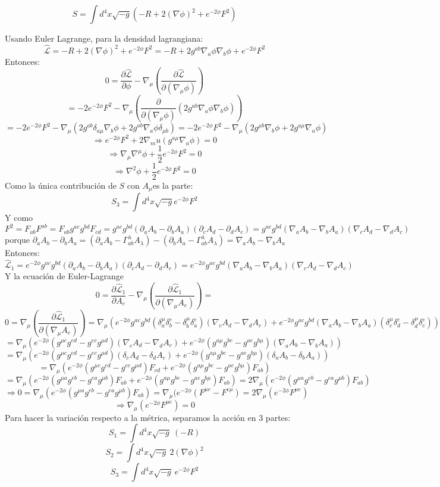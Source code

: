 \documentclass[10pt,a4paper]{article}
\begin{document}
$$S = \int d^4x \sqrt{-g}(-R +2(\nabla \phi)^2 + e^{-2 \phi} F^2)$$

Usando Euler Lagrange, para la densidad lagrangiana:
$$ \hat{\mathcal{L}} = -R + 2(\nabla \phi)^2 + e^{-2 \phi} F^2 = -R + 2g^{ab}\nabla_a\phi\nabla_b\phi + e^{-2 \phi} F^2 $$
Entonces:
$$0 = \frac{\partial \hat{\mathcal{L}}}{\partial \phi} - \nabla_\mu (\frac{\partial \hat{\mathcal{L}}}{\partial (\nabla_\mu \phi)}) $$
$$ = -2e^{-2\phi}F^2 - \nabla_\mu(\frac{\partial }{\partial (\nabla_\mu \phi)}(2g^{ab}\nabla_a\phi \nabla_b\phi))$$
$$= -2e^{-2\phi} F^2 - \nabla_\mu(2g^{ab}\delta_{a\mu}\nabla_b\phi + 2g^{ab}\nabla_a\phi \delta_{\mu b}) = -2e^{-2\phi}F^2 - \nabla_\mu(2g^{\mu b}\nabla_b\phi + 2g^{a\mu}\nabla_a\phi)$$
$$\Rightarrow e^{-2\phi}F^2 + 2\nabla_mu (g^{a\mu}\nabla_a \phi) = 0$$
$$\Rightarrow \nabla_{\mu} \nabla^{\mu} \phi + \frac{1}{2}e^{-2\phi}F^2  = 0$$
$$\Rightarrow  \nabla^2 \phi + \frac{1}{2}e^{-2\phi}F^2 = 0$$
Como la única contribución de $S$ con $A_{\mu}$es la parte:
$$S_3 = \int d^4x \sqrt{-g}e^{-2 \phi}F^2$$
Y como $F^2 = F_{ab}F^{ab}= F_{ab}g^{ac}g^{bd}F_{cd} = g^{ac}g^{bd}(\partial_a A_b -\partial_b A_a)(\partial_c A_d -\partial_d A_c) = g^{ac}g^{bd}(\nabla_a A_b -\nabla_b A_a)(\nabla_c A_d -\nabla_d A_c)$ porque $ \partial_a A_b -\partial_b A_a = (\partial_a A_b -\Gamma^{\lambda}_{ab}A_\lambda) -(\partial_b A_a - \Gamma^\lambda_{ab}A_{\lambda}) = \nabla_a A_b -\nabla_b A_a$
Entonces:
$$\hat{\mathcal{L}}_1 = e^{-2 \phi} g^{ac}g^{bd}(\partial_a A_b -\partial_b A_a)(\partial_c A_d -\partial_d A_c) = e^{-2 \phi} g^{ac}g^{bd}(\nabla_a A_b -\nabla_b A_a)(\nabla_c A_d -\nabla_d A_c)$$
Y la ecuación de Euler-Lagrange
$$0 = \frac{\partial \hat{\mathcal{L}}_1}{\partial A_e} - \nabla_\mu (\frac{\partial \hat{\mathcal{L}}_1}{\partial (\nabla_\mu A_e)}) = $$
$$0 = \nabla_\mu (\frac{\partial \hat{\mathcal{L}}_1}{\partial (\nabla_\mu A_e)}) = \nabla_\mu (e^{-2\phi}g^{ac}g^{bd}(\delta^\mu_{a}\delta^e_{b}-\delta^\mu_{b}\delta^e_{a})(\nabla_c A_d - \nabla_d A_c) +e^{-2\phi}g^{ac}g^{bd}(\nabla_a A_b -\nabla_b A_a)(\delta^\mu_{c}\delta^e_{d}-\delta^\mu_{d}\delta^e_{c}))$$
$$= \nabla_\mu (e^{-2\phi}(g^{\mu c}g^{ed}-g^{ec}g^{\mu d})(\nabla_c A_d - \nabla_d A_c) +e^{-2\phi}(g^{a\mu}g^{be} - g^{ae}g^{b\mu})(\nabla_a A_b -\nabla_b A_a))$$
$$= \nabla_\mu (e^{-2\phi}(g^{\mu c}g^{ed}-g^{ec}g^{\mu d})(\delta_c A_d - \delta_d A_c) +e^{-2\phi}(g^{a\mu}g^{be} - g^{ae}g^{b\mu})(\delta_a A_b -\delta_b A_a))$$
$$= \nabla_\mu (e^{-2\phi}(g^{\mu c}g^{ed}-g^{ec}g^{\mu d})F_{cd} +e^{-2\phi}(g^{a\mu}g^{be} - g^{ae}g^{b\mu})F_{ab})$$
$$ = \nabla_\mu (e^{-2\phi}(g^{\mu a}g^{eb}-g^{ea}g^{\mu b})F_{ab} +e^{-2\phi}(g^{a\mu}g^{be} - g^{ae}g^{b\mu})F_{ab}) = 2\nabla_\mu (e^{-2\phi}(g^{\mu a}g^{eb}-g^{ea}g^{\mu b})F_{ab})$$
$$\Rightarrow 0 = \nabla_\mu (e^{-2\phi}(g^{\mu a}g^{eb}-g^{ea}g^{\mu b})F_{ab}) = \nabla_\mu (e^{-2\phi}(F^{\mu e} - F^{e \mu})= 2\nabla_\mu (e^{-2\phi}F^{\mu e})$$
$$\Rightarrow\nabla_\mu (e^{-2\phi}F^{\mu e}) = 0$$
Para hacer la variación respecto a la métrica, separamos la acción en 3 partes:
$$S_1 = \int d^4x \sqrt{-g}\:(-R)$$
$$S_2 = \int d^4x \sqrt{-g}\:2(\nabla \phi)^2$$
$$S_3 = \int d^4x \sqrt{-g}\:e^{-2 \phi} F^2$$
\end{document}
